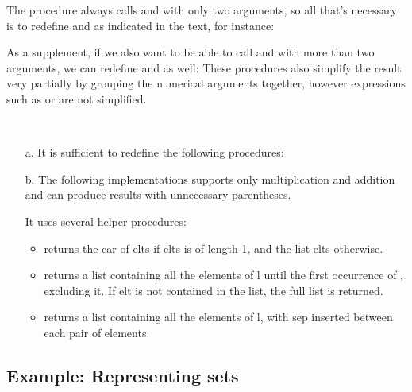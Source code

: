 \begin{exe}[2.57]
    The  procedure always calls  and 
     with only two arguments, so all that’s necessary is to 
    redefine  and  as indicated in the text, for 
    instance:

    As a supplement, if we also want to be able to call  and 
     with more than two arguments, we can redefine 
     and  as well:
    These procedures also simplify the result very partially by grouping the 
    numerical arguments together, however expressions such as
     or
     are not simplified.
\end{exe}

\begin{exe}[2.58]
    \ \vspace{-20pt}
    \begin{itemize}
        \item[a.] It is sufficient to redefine the following procedures:
        \item[b.] The following implementations supports only multiplication and 
            addition and can produce results with unnecessary parentheses.

            It uses several helper procedures:
            \begin{itemize}
                \item {} returns the car of elts if elts 
                    is of length 1, and the list elts otherwise.
                \item {} returns a list containing all 
                    the elements of l until the first occurrence of , 
                    excluding it. If elt is not contained in the list, the full 
                    list is returned.
                \item {} returns a list containing all 
                    the elements of l, with sep inserted between each pair of 
                    elements.
            \end{itemize}
    \end{itemize}
\end{exe}

\subsection{Example: Representing sets}

